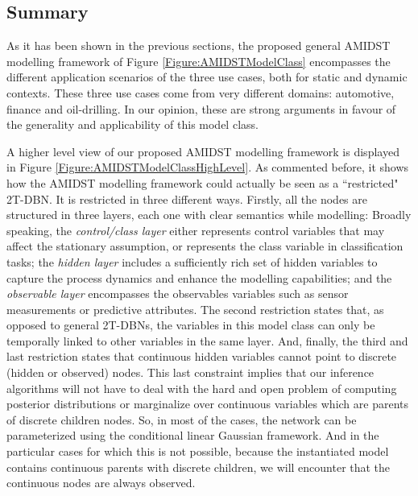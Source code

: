 \subsection{Summary}\label{summaryAMIDSTModels}

As it has been shown in the previous sections, the proposed general AMIDST modelling framework of Figure \ref{Figure:AMIDSTModelClass} encompasses the different application scenarios of the three use cases, both for static and dynamic contexts. These three use cases come from very different domains: automotive, finance and oil-drilling. In our opinion, these are strong arguments in favour of the generality and applicability of this model class. 

A higher level view of our proposed AMIDST modelling framework is displayed in Figure \ref{Figure:AMIDSTModelClassHighLevel}. As commented before, it shows how the AMIDST modelling framework could actually be seen as a ``restricted" 2T-DBN. It is restricted in three different ways. Firstly, all the nodes are structured in three layers, each one with clear semantics while modelling: Broadly speaking, the \textit{control/class layer} either represents control variables that may affect the stationary assumption, or represents the class variable in classification tasks; the \textit{hidden layer} includes a sufficiently rich set of hidden variables to capture the process dynamics and enhance the modelling capabilities; and the \textit{observable layer} encompasses the observables variables such as sensor measurements or predictive attributes. The second restriction states that, as opposed to general 2T-DBNs, the variables in this model class can only be temporally linked to other variables in the same layer. And, finally, the third and last restriction  states that continuous hidden variables cannot point to discrete (hidden or observed) nodes. This last constraint implies that our inference algorithms will not have to deal with the hard and open problem of computing posterior distributions or marginalize over continuous variables which are parents of discrete children nodes. So, in most of the cases, the network can be parameterized using the conditional linear Gaussian framework. And in the particular cases for which this is not possible, because the instantiated model contains continuous parents with discrete children, we will encounter that the continuous nodes are always observed. 

